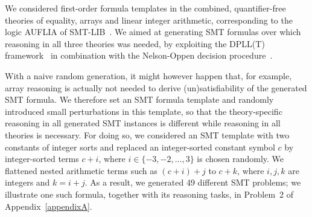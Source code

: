 We considered first-order formula templates in the combined,
quantifier-free 
theories of equality, arrays and linear integer arithmetic,
corresponding to the logic AUFLIA of
SMT-LIB~\cite{barrett2017smtlib}. We aimed at generating SMT formulas
over which reasoning in all three theories was needed, by exploiting
the DPLL(T) framework~\cite{Tinelli02} in combination with the
Nelson-Oppen decision procedure~\cite{Nelson79}.
%

With a  naive random generation,  it might however happen
that, for example, array reasoning is actually not needed to derive
(un)satisfi\-ability of the generated SMT formula. We therefore set an
SMT formula template and 
%
%
randomly introduced small perturbations in this template,  so that the
theory-specific reasoning in all generated SMT instances is
different while reasoning in all theories is necessary.
For doing so, we considered an SMT template with two constants of
integer sorts and replaced an integer-sorted constant symbol $c$ by  integer-sorted terms $c+i$,
where $i \in \{-3,-2,\dots,3\}$ is chosen randomly. We flattened nested arithmetic terms such as $(c+i)+j$ to $c+k$,
where $i,j,k$ are integers and $k = i+j$. As a result, we
generated 49 different SMT problems; we illustrate one such formula, together
with its reasoning tasks, in Problem~2 of Appendix~\ref{appendixA}.

